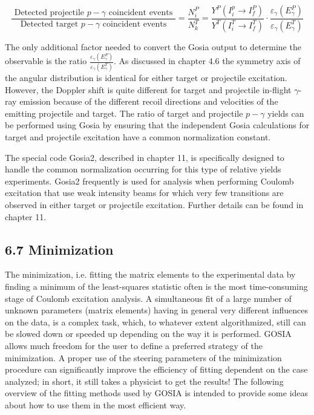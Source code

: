 \documentclass[10pt]{article}
\begin{document}
\begin{equation*}
\frac{\text { Detected projectile } p-\gamma \text { coincident events }}{\text { Detected target } p-\gamma \text { coincident events }}=\frac{N_{i}^{P}}{N_{k}^{T}}=\frac{Y^{P}\left(I_{i}^{p} \rightarrow I_{f}^{P}\right)}{Y^{T}\left(I_{i}^{T} \rightarrow I_{f}^{T}\right)} \cdot \frac{\varepsilon_{\gamma}\left(E_{\gamma}^{P}\right)}{\varepsilon_{\gamma}\left(E_{\gamma}^{T}\right)} \tag{6.76}
\end{equation*}


The only additional factor needed to convert the Gosia output to determine the observable is the ratio $\frac{\varepsilon_{\gamma}\left(E_{\gamma}^{P}\right)}{\varepsilon_{\gamma}\left(E_{\gamma}^{T}\right)}$. As discussed in chapter 4.6 the symmetry axis of the angular distribution is identical for either target or projectile excitation. However, the Doppler shift is quite different for target and projectile in-flight $\gamma$-ray emission because of the different recoil directions and velocities of the emitting projectile and target. The ratio of target and projectile $p-\gamma$ yields can be performed using Gosia by ensuring that the independent Gosia calculations for target and projectile excitation have a common normalization constant.

The special code Gosia2, described in chapter 11, is specifically designed to handle the common normalization occurring for this type of relative yields experiments. Gosia2 frequently is used for analysis when performing Coulomb excitation that use weak intensity beams for which very few transitions are observed in either target or projectile excitation. Further details can be found in chapter 11.

\subsection*{6.7 Minimization}
The minimization, i.e. fitting the matrix elements to the experimental data by finding a minimum of the least-squares statistic often is the most time-consuming stage of Coulomb excitation analysis. A simultaneous fit of a large number of unknown parameters (matrix elements) having in general very different influences on the data, is a complex task, which, to whatever extent algorithmized, still can be slowed down or speeded up depending on the way it is performed. GOSIA allows much freedom for the user to define a preferred strategy of the minimization. A proper use of the steering parameters of the minimization procedure can significantly improve the efficiency of fitting dependent on the case analyzed; in short, it still takes a physicist to get the results! The following overview of the fitting methods used by GOSIA is intended to provide some ideas about how to use them in the most efficient way.
\end{document}
